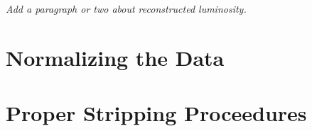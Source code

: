 \documentclass[12pt]{article}
\begin{document}
{\it Add a paragraph or two about reconstructed luminosity.}

\section{Normalizing the Data}

\section{Proper Stripping Proceedures}

\newpage
% 
%

 
\end{document}
